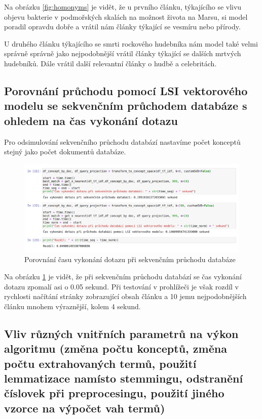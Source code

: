 \documentclass[11pt]{scrartcl} %
\begin{document}
Na obrázku \ref{fig:homonyms} je vidět, že u prvního článku, týkajícího se vlivu objevu bakterie v podmořských skalách na možnost života na Marsu, si model poradil opravdu dobře a vrátil nám články týkající se vesmíru nebo přírody.
\bigskip

U druhého článku týkajícího se smrti rockového hudebníka nám model také velmi správně správně jako nejpodobnější vrátil články týkající se dalších mrtvých hudebníků. Dále vrátil další relevantní články o hudbě a celebritách.

\subsection{Porovnání průchodu pomocí LSI vektorového modelu se sekvenčním průchodem databáze s ohledem na čas vykonání dotazu}

Pro odsimulování sekvenčního průchodu databází nastavíme počet konceptů stejný jako počet dokumentů databáze.

\begin{figure}[h] %
	\centering
	\includegraphics[width=1\columnwidth]{images/measure_time.png}
	\caption{Porovnání času vykonání dotazu při sekvenčním průchodu databáze}
	\label{fig:measure_time}
\end{figure}

\bigskip

Na obrázku \ref{fig:measure_time} je vidět, že při sekvenčním průchodu databází se čas vykonání dotazu zpomalí asi o
0.05 sekund. Při testování v prohlížeči je však rozdíl v rychlosti načítání stránky zobrazující obsah článku a 10 jemu nejpodobnějších článku mnohem výraznější, kolem 4 sekund.

\subsection{Vliv různých vnitřních parametrů na výkon algoritmu (změna počtu konceptů, změna počtu extrahovaných termů, použití lemmatizace namísto stemmingu, odstranění číslovek při preprocesingu, použití jiného vzorce na výpočet vah termů)}
\end{document}
